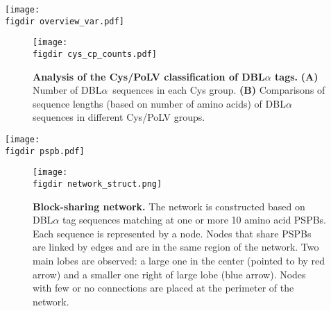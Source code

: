 \documentclass[10pt,twocolumn,superscriptaddress]{revtex4-1}
\newcommand{\pfem}{{PfEMP1}\xspace}
\newcommand{\dbla}{{DBL$\alpha$}\xspace}
\newcommand{\cp}{{Cys/PoLV}\xspace}
\newcommand{\figdir}{figures/}
\begin{document}
\begin{figure*}[t]
	\centering
	\texttt{[image: \\figdir overview\_var.pdf]}
	\caption{\textbf{Overview of \pfem,} the \textit{Plasmodium falciparum} virulence factor encoded by \textit{var} genes. \pfem molecules are usually made up of two to nine domains: N-terminal segment (NTS), Duffy binding-like (DBL), cysteine-rich inter-domain region (CIDR), transmembrane (TM), and the intracellular acidic terminal segment (ATS) domains. The \dbla subdomain, called ``tag," can be classified by two methods: 1) the \cp groups based on number of cysteines and the presence of either (or neither) motif MFK or REY, 2) block-sharing groups based on sequences sharing position-specific polymorphic blocks (PSPBs). This diagram shows an example \dbla tag sequence, with the PSPBs highlighted in blue, the two cysteines in pink, and the motif MFK belonging to PoLV group 1 in orange.}
	\label{overview}
\end{figure*}

\begin{figure}[t]
	\centering
	\texttt{[image: \\figdir cys\_cp\_counts.pdf]}
	\caption{ \textbf{Analysis of the \cp classification of \dbla tags.} \textbf{(A)} Number of \dbla\ sequences in each Cys group.  \textbf{(B)} Comparisons of sequence lengths (based on number of amino acids) of \dbla sequences in different \cp groups.}
	\label{cp}
\end{figure}

\begin{figure*}[t]
	\centering
	\texttt{[image: \\figdir pspb.pdf]}
	\caption{{\bf Position specific polymorphic blocks (PSPBs)}. Four polymorphic blocks (purple) for four example tag sequences at fixed locations based on three conserved anchor points shaded in orange. }
	\label{pspb}
\end{figure*}

\begin{figure}[t]
	\centering
	\texttt{[image: \\figdir network\_struct.png]}
	\caption{{\bf Block-sharing network.} The network is constructed based on \dbla tag sequences matching at one or more 10 amino acid PSPBs. Each sequence is represented by a node. Nodes that share PSPBs are linked by edges and are in the same region of the network. Two main lobes are observed: a large one in the center (pointed to by red arrow) and a smaller one right of large lobe (blue arrow). Nodes with few or no connections are placed at the perimeter of the network.}
	\label{struct}
\end{figure}
\end{document}
